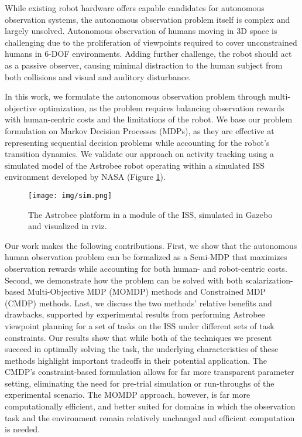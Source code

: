 \documentclass[letterpaper, 10 pt, conference]{ieeeconf}  %
\begin{document}
While existing robot hardware offers capable candidates for autonomous observation systems, the autonomous observation problem itself is complex and largely unsolved.  Autonomous observation of humans moving in 3D space is challenging due to the proliferation of viewpoints required to cover unconstrained humans in 6-DOF environments.  Adding further challenge, the robot should act as a passive observer, causing minimal distraction to the human subject from both collisions and visual and auditory disturbance.

In this work, we formulate the autonomous observation problem through multi-objective optimization, as the problem requires balancing observation rewards with human-centric costs and the limitations of the robot.  We base our problem formulation on Markov Decision Processes (MDPs), as they are effective at representing sequential decision problems while accounting for the robot's transition dynamics.  We validate our approach on activity tracking using a simulated model of the Astrobee robot operating within a simulated ISS environment developed by NASA (Figure \ref{fig:sim}).

\begin{figure}[tb]
\centering
\texttt{[image: img/sim.png]}
\caption{The Astrobee platform in a module of the ISS, simulated in Gazebo and visualized in rviz.}
\label{fig:sim}
\vspace{-0.2cm}
\end{figure}

Our work makes the following contributions.  First, we show that the autonomous human observation problem can be formalized as a Semi-MDP that maximizes observation rewards while accounting for both human- and robot-centric costs.  Second, we demonstrate how the problem can be solved with both scalarization-based Multi-Objective MDP (MOMDP) methods and Constrained MDP (CMDP) methods.  Last, we discuss the two methods' relative benefits and drawbacks, supported by experimental results from performing Astrobee viewpoint planning for a set of tasks on the ISS under different sets of task constraints.  Our results show that while both of the techniques we present succeed in optimally solving the task, the underlying characteristics of these methods highlight important tradeoffs in their potential application.  The CMDP's constraint-based formulation allows for far more transparent parameter setting, eliminating the need for pre-trial simulation or run-throughs of the experimental scenario.  The MOMDP approach, however, is far more computationally efficient, and better suited for domains in which the observation task and the environment remain relatively unchanged and efficient computation is needed. 
\end{document}
